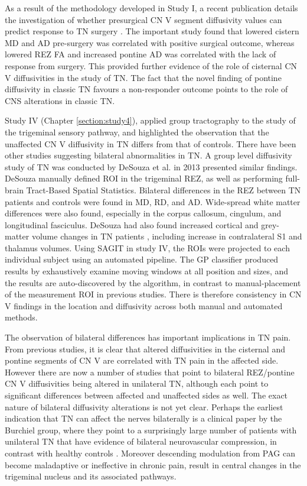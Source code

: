As a result of the methodology developed in Study I, a recent publication details the investigation of whether presurgical CN V segment diffusivity values can predict response to TN surgery \cite{Hung2017}. The important study found that lowered cistern MD and AD pre-surgery was correlated with positive surgical outcome, whereas lowered REZ FA and increased pontine AD was correlated with the lack of response from surgery. This provided further evidence of the role of cisternal CN V diffusivities in the study of TN. The fact that the novel finding of pontine diffusivity in classic TN favours a non-responder outcome points to the role of CNS alterations in classic TN.

Study IV (Chapter \ref{section:study4}), applied group tractography to the study of the trigeminal sensory pathway, and highlighted the observation that the unaffected CN V diffusivity in TN differs from that of controls. There have been other studies suggesting bilateral abnormalities in TN. A group level diffusivity study of TN was conducted by DeSouza et al. in 2013 \cite{Desouza2013} presented similar findings. DeSouza manually defined ROI in the trigeminal REZ, as well as performing full-brain Tract-Based Spatial Statistics. Bilateral differences in the REZ between TN patients and controls were found in MD, RD, and AD. Wide-spread white matter differences were also found, especially in the corpus callosum, cingulum, and longitudinal fasciculus. DeSouza had also found increased cortical and grey-matter volume changes in TN patients \cite{Desouza2013c}, including increase in contralateral S1 and thalamus volumes.
Using SAGIT in study IV, the ROIs were projected to each individual subject using an automated pipeline. The GP classifier produced results by exhaustively examine moving windows at all position and sizes, and the results are auto-discovered by the algorithm, in contrast to manual-placement of the measurement ROI in previous studies. There is therefore consistency in CN V findings in the location and diffusivity across both manual and automated methods.

The observation of bilateral differences has important implications in TN pain. From previous studies, it is clear that altered diffusivities in the cisternal and pontine segments of CN V are correlated with TN pain in the affected side. However there are now a number of studies that point to bilateral REZ/pontine CN V diffusivities being altered in unilateral TN, although each point to significant differences between affected and unaffected sides as well. The exact nature of bilateral diffusivity alterations is not yet clear. Perhaps the earliest indication that TN can affect the nerves bilaterally is a clinical paper by the Burchiel group, where they point to a surprisingly large number of patients with unilateral TN that have evidence of bilateral neurovascular compression, in contrast with healthy controls \cite{Miller2009}. Moreover descending modulation from PAG can become maladaptive or ineffective in chronic pain, result in central changes in the trigeminal nucleus and its associated pathways.

